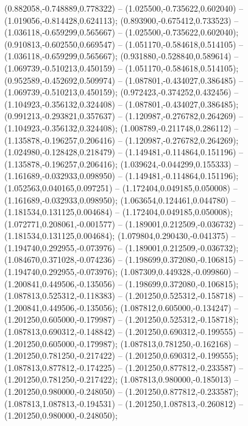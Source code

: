  (0.882058,-0.748889,0.778322) -- (1.025500,-0.735622,0.602040) -- (1.019056,-0.814428,0.624113);
 (0.893900,-0.675412,0.733523) -- (1.036118,-0.659299,0.565667) -- (1.025500,-0.735622,0.602040);
 (0.910813,-0.602550,0.669547) -- (1.051170,-0.584618,0.514105) -- (1.036118,-0.659299,0.565667);
 (0.931880,-0.528840,0.589614) -- (1.069739,-0.510213,0.450159) -- (1.051170,-0.584618,0.514105);
 (0.952589,-0.452692,0.509974) -- (1.087801,-0.434027,0.386485) -- (1.069739,-0.510213,0.450159);
 (0.972423,-0.374252,0.432456) -- (1.104923,-0.356132,0.324408) -- (1.087801,-0.434027,0.386485);
 (0.991213,-0.293821,0.357637) -- (1.120987,-0.276782,0.264269) -- (1.104923,-0.356132,0.324408);
 (1.008789,-0.211748,0.286112) -- (1.135878,-0.196257,0.206416) -- (1.120987,-0.276782,0.264269);
 (1.024980,-0.128428,0.218479) -- (1.149481,-0.114864,0.151196) -- (1.135878,-0.196257,0.206416);
 (1.039624,-0.044299,0.155333) -- (1.161689,-0.032933,0.098950) -- (1.149481,-0.114864,0.151196);
 (1.052563,0.040165,0.097251) -- (1.172404,0.049185,0.050008) -- (1.161689,-0.032933,0.098950);
 (1.063654,0.124461,0.044780) -- (1.181534,0.131125,0.004684) -- (1.172404,0.049185,0.050008);
 (1.072771,0.208061,-0.001577) -- (1.189001,0.212509,-0.036732) -- (1.181534,0.131125,0.004684);
 (1.079804,0.290430,-0.041375) -- (1.194740,0.292955,-0.073976) -- (1.189001,0.212509,-0.036732);
 (1.084670,0.371028,-0.074236) -- (1.198699,0.372080,-0.106815) -- (1.194740,0.292955,-0.073976);
 (1.087309,0.449328,-0.099860) -- (1.200841,0.449506,-0.135056) -- (1.198699,0.372080,-0.106815);
 (1.087813,0.525312,-0.118383) -- (1.201250,0.525312,-0.158718) -- (1.200841,0.449506,-0.135056);
 (1.087812,0.605000,-0.134247) -- (1.201250,0.605000,-0.179987) -- (1.201250,0.525312,-0.158718);
 (1.087813,0.690312,-0.148842) -- (1.201250,0.690312,-0.199555) -- (1.201250,0.605000,-0.179987);
 (1.087813,0.781250,-0.162168) -- (1.201250,0.781250,-0.217422) -- (1.201250,0.690312,-0.199555);
 (1.087813,0.877812,-0.174225) -- (1.201250,0.877812,-0.233587) -- (1.201250,0.781250,-0.217422);
 (1.087813,0.980000,-0.185013) -- (1.201250,0.980000,-0.248050) -- (1.201250,0.877812,-0.233587);
 (1.087813,1.087813,-0.194531) -- (1.201250,1.087813,-0.260812) -- (1.201250,0.980000,-0.248050);
